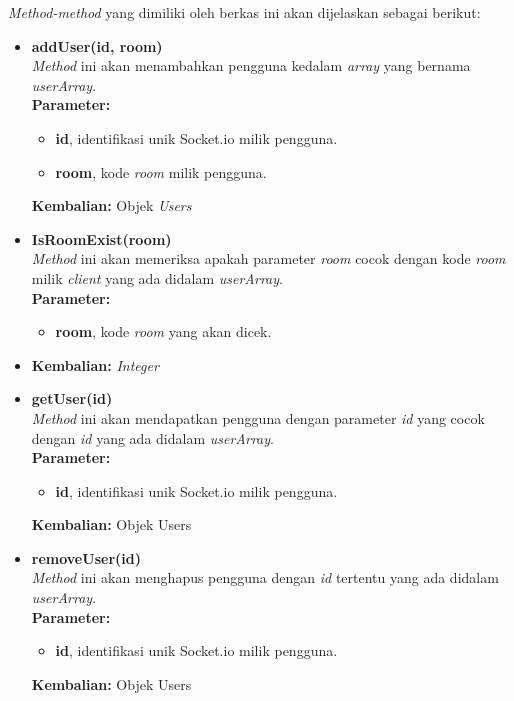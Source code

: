 \begin{enumerate}
\begin{enumerate}
\begin{itemize}
			\textit{Method-method} yang dimiliki oleh berkas ini akan dijelaskan sebagai berikut:
			\begin{itemize}
				\item \textbf{addUser(id, room)} \\
				\textit{Method} ini akan menambahkan pengguna kedalam \textit{array} yang bernama \textit{userArray}. \\
				\textbf{Parameter:}
				\begin{itemize}
					\item \textbf{id}, identifikasi unik Socket.io milik pengguna.
					\item \textbf{room}, kode \textit{room} milik pengguna.
				\end{itemize}
				\textbf{Kembalian:} Objek \textit{Users}
				
				\item \textbf{IsRoomExist(room)} \\
				\textit{Method} ini akan memeriksa apakah parameter \textit{room} cocok dengan kode \textit{room} milik \textit{client} yang ada didalam \textit{userArray}. \\
				\textbf{Parameter:}
				\begin{itemize}
					\item \textbf{room}, kode \textit{room} yang akan dicek.
				\end{itemize}
				\item \textbf{Kembalian:} \textit{Integer}
				
				\item \textbf{getUser(id)} \\
				\textit{Method} ini akan mendapatkan pengguna dengan parameter \textit{id} yang cocok dengan \textit{id} yang ada didalam \textit{userArray}. \\
				\textbf{Parameter:}
				\begin{itemize}
					\item \textbf{id}, identifikasi unik Socket.io milik pengguna.
				\end{itemize}
				\textbf{Kembalian:} Objek Users
				
				\item \textbf{removeUser(id)} \\ 
				\textit{Method} ini akan menghapus pengguna dengan \textit{id} tertentu yang ada didalam \textit{userArray}. \\
				\textbf{Parameter:}
				\begin{itemize}
					\item \textbf{id}, identifikasi unik Socket.io milik pengguna.
				\end{itemize}
				\textbf{Kembalian:} Objek Users
				

\end{itemize}
\end{itemize}
\end{enumerate}
\end{enumerate}
